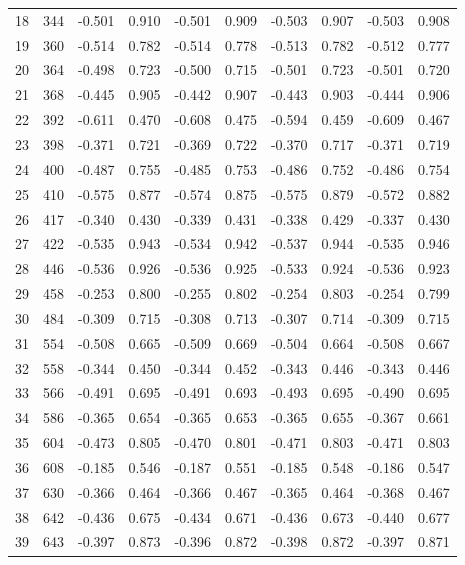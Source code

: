 \documentclass{amsart}
\begin{document}
\begin{longtable}{rrrrrrrrrr}
  18 & 344 & -0.501 & 0.910 & -0.501 & 0.909 & -0.503 & 0.907 & -0.503 & 0.908 \\ 
  19 & 360 & -0.514 & 0.782 & -0.514 & 0.778 & -0.513 & 0.782 & -0.512 & 0.777 \\ 
  20 & 364 & -0.498 & 0.723 & -0.500 & 0.715 & -0.501 & 0.723 & -0.501 & 0.720 \\ 
  21 & 368 & -0.445 & 0.905 & -0.442 & 0.907 & -0.443 & 0.903 & -0.444 & 0.906 \\ 
  22 & 392 & -0.611 & 0.470 & -0.608 & 0.475 & -0.594 & 0.459 & -0.609 & 0.467 \\ 
  23 & 398 & -0.371 & 0.721 & -0.369 & 0.722 & -0.370 & 0.717 & -0.371 & 0.719 \\ 
  24 & 400 & -0.487 & 0.755 & -0.485 & 0.753 & -0.486 & 0.752 & -0.486 & 0.754 \\ 
  25 & 410 & -0.575 & 0.877 & -0.574 & 0.875 & -0.575 & 0.879 & -0.572 & 0.882 \\ 
  26 & 417 & -0.340 & 0.430 & -0.339 & 0.431 & -0.338 & 0.429 & -0.337 & 0.430 \\ 
  27 & 422 & -0.535 & 0.943 & -0.534 & 0.942 & -0.537 & 0.944 & -0.535 & 0.946 \\ 
  28 & 446 & -0.536 & 0.926 & -0.536 & 0.925 & -0.533 & 0.924 & -0.536 & 0.923 \\ 
  29 & 458 & -0.253 & 0.800 & -0.255 & 0.802 & -0.254 & 0.803 & -0.254 & 0.799 \\ 
  30 & 484 & -0.309 & 0.715 & -0.308 & 0.713 & -0.307 & 0.714 & -0.309 & 0.715 \\ 
  31 & 554 & -0.508 & 0.665 & -0.509 & 0.669 & -0.504 & 0.664 & -0.508 & 0.667 \\ 
  32 & 558 & -0.344 & 0.450 & -0.344 & 0.452 & -0.343 & 0.446 & -0.343 & 0.446 \\ 
  33 & 566 & -0.491 & 0.695 & -0.491 & 0.693 & -0.493 & 0.695 & -0.490 & 0.695 \\ 
  34 & 586 & -0.365 & 0.654 & -0.365 & 0.653 & -0.365 & 0.655 & -0.367 & 0.661 \\ 
  35 & 604 & -0.473 & 0.805 & -0.470 & 0.801 & -0.471 & 0.803 & -0.471 & 0.803 \\ 
  36 & 608 & -0.185 & 0.546 & -0.187 & 0.551 & -0.185 & 0.548 & -0.186 & 0.547 \\ 
  37 & 630 & -0.366 & 0.464 & -0.366 & 0.467 & -0.365 & 0.464 & -0.368 & 0.467 \\ 
  38 & 642 & -0.436 & 0.675 & -0.434 & 0.671 & -0.436 & 0.673 & -0.440 & 0.677 \\ 
  39 & 643 & -0.397 & 0.873 & -0.396 & 0.872 & -0.398 & 0.872 & -0.397 & 0.871 \\ 

\end{longtable}
\end{document}
